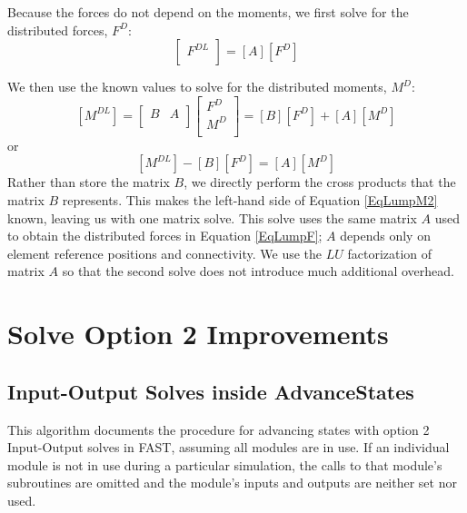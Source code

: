 \documentclass[10pt,letterpaper,oneside,notitlepage]{article}
\begin{document}
Because the forces do not depend on the moments, we first solve for the distributed forces, $F^D$:
\begin{equation}
\label{EqLumpF}
   \begin{bmatrix}   F^{DL} \\   \end{bmatrix}
=
   \left[      A    \right]
   \left[   F^{D}  \right]
\end{equation}

We then use the known values to solve for the distributed moments, $M^D$:
\begin{equation}
\label{EqLumpM1}
   \left[   M^{DL} \right]
=
   \begin{bmatrix} B & A \\   \end{bmatrix}
   \begin{bmatrix}
   F^{D} \\
   M^{D} \\
   \end{bmatrix}
= \left[   B \right] \left[   F^D \right] + \left[   A \right] \left[   M^D \right] 
\end{equation}
or
\begin{equation}
\label{EqLumpM2}
\left[   M^{DL} \right] - \left[   B \right] \left[   F^D \right] = \left[   A \right] \left[   M^D \right]
\end{equation}
Rather than store the matrix $B$, we directly perform the cross products that the matrix $B$ represents.
This makes the left-hand side of Equation \ref{EqLumpM2} known, leaving us with one matrix solve. This 
solve uses the same matrix $A$ used to obtain the distributed forces in Equation \ref{EqLumpF}; $A$ depends 
only on element reference positions and connectivity. We use 
the $LU$ factorization of matrix $A$ so that the second solve does not introduce much additional overhead.



\pagebreak %
\section{Solve Option 2 Improvements}
\subsection {Input-Output Solves inside AdvanceStates}
This algorithm documents the procedure for advancing states with option 2 
Input-Output solves in FAST, assuming
all modules are in use. If an individual module is not in use during a particular
simulation, the calls to that module's subroutines are omitted and the module's 
inputs and outputs are neither set nor used.
\end{document}
